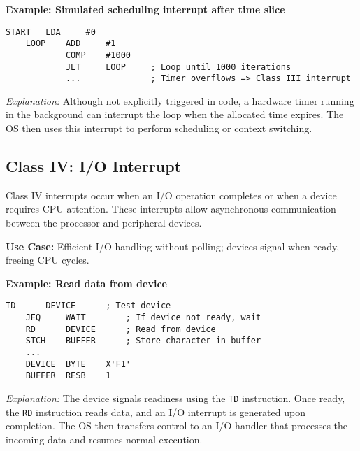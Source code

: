 \documentclass[12pt]{article}
\begin{document}
    \textbf{Example: Simulated scheduling interrupt after time slice}
    
    \begin{lstlisting}[language={[x86masm]Assembler}]
    START   LDA     #0
    LOOP    ADD     #1
            COMP    #1000
            JLT     LOOP     ; Loop until 1000 iterations
            ...              ; Timer overflows => Class III interrupt
    \end{lstlisting}
    
    \textit{Explanation:} Although not explicitly triggered in code, a hardware timer running in the background can interrupt the loop when the allocated time expires. The OS then uses this interrupt to perform scheduling or context switching.
    
    \vspace{0.2cm}
    
    \subsection*{Class IV: I/O Interrupt}
    
    Class IV interrupts occur when an I/O operation completes or when a device requires CPU attention. These interrupts allow asynchronous communication between the processor and peripheral devices.
    
    \textbf{Use Case:} Efficient I/O handling without polling; devices signal when ready, freeing CPU cycles.
    
    \textbf{Example: Read data from device}
    
    \begin{lstlisting}[language={[x86masm]Assembler}]
    TD      DEVICE      ; Test device
    JEQ     WAIT        ; If device not ready, wait
    RD      DEVICE      ; Read from device
    STCH    BUFFER      ; Store character in buffer
    ...
    DEVICE  BYTE    X'F1'
    BUFFER  RESB    1
    \end{lstlisting}
    
    \textit{Explanation:} The device signals readiness using the \texttt{TD} instruction. Once ready, the \texttt{RD} instruction reads data, and an I/O interrupt is generated upon completion. The OS then transfers control to an I/O handler that processes the incoming data and resumes normal execution.
\end{document}
